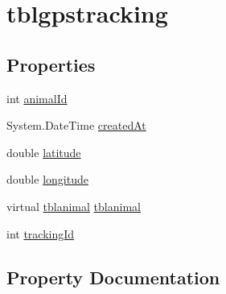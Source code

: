 \hypertarget{classWildLifeTracker_1_1tblgpstracking}{}\section{tblgpstracking}
\label{classWildLifeTracker_1_1tblgpstracking}
\subsection*{Properties}
\begin{DoxyCompactItemize}
\item 
int \hyperlink{classWildLifeTracker_1_1tblgpstracking_a99787b9867ae390df467a99040589a55}{animal\+Id}
\item 
System.\+Date\+Time \hyperlink{classWildLifeTracker_1_1tblgpstracking_a0da6329d5fbb1b91739557ad49ece9c0}{created\+At}
\item 
double \hyperlink{classWildLifeTracker_1_1tblgpstracking_a76714bdbc5c536fa77dfb14533ff82a9}{latitude}
\item 
double \hyperlink{classWildLifeTracker_1_1tblgpstracking_ac155e35fdeebafc89723a51520fb9fe6}{longitude}
\item 
virtual \hyperlink{classWildLifeTracker_1_1tblanimal}{tblanimal} \hyperlink{classWildLifeTracker_1_1tblgpstracking_ac15c6239223b3b3eea8fa42336daa5bd}{tblanimal}
\item 
int \hyperlink{classWildLifeTracker_1_1tblgpstracking_a7291076f1fbf1ead00eb6c30cf33d943}{tracking\+Id}
\end{DoxyCompactItemize}


\subsection{Property Documentation}
\mbox{\label{classWildLifeTracker_1_1tblgpstracking_a99787b9867ae390df467a99040589a55}} 
